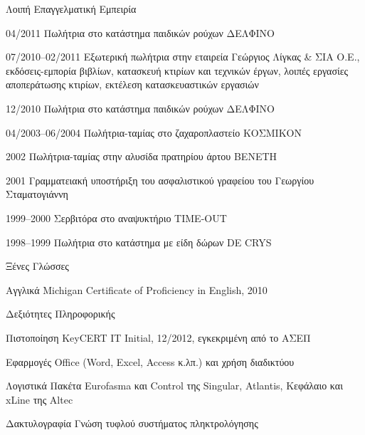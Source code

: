 \documentclass[a4paper]{article}
\begin{document}
\begin{cv}{}
\begin{cvlist}{Λοιπή Επαγγελματική Εμπειρία}
  \item[04/2011] Πωλήτρια στο κατάστημα παιδικών ρούχων
                 \textsf{ΔΕΛΦΙΝΟ}
  \item[07/2010–02/2011] Εξωτερική πωλήτρια στην εταιρεία
                         \textsf{Γεώργιος Λίγκας \& ΣΙΑ
                         Ο.Ε.}, {εκδόσεις}-εμπορία βιβλίων,
                         κατασκευή κτιρίων και τεχνικών
                         έργων, λοιπές εργασίες αποπεράτωσης
                         κτιρίων, εκτέλεση κατασκευαστικών
                         εργασιών
  \item[12/2010] Πωλήτρια στο κατάστημα παιδικών ρούχων
                 \textsf{ΔΕΛΦΙΝΟ}
  \item[04/2003–06/2004] Πωλήτρια-ταμίας στο ζαχαροπλαστείο
                         \textsf{ΚΟΣΜΙΚΟΝ}
  \item[2002] Πωλήτρια-ταμίας στην αλυσίδα πρατηρίου άρτου
              \textsf{ΒΕΝΕΤΗ}
  \item[2001] Γραμματειακή υποστήριξη του ασφαλιστικού
              γραφείου του \textsf{Γεωργίου Σταματογιάννη}
  \item[1999–2000] Σερβιτόρα στο αναψυκτήριο
                   \textsf{TIME-OUT}
  \item[1998–1999] Πωλήτρια στο κατάστημα με είδη δώρων
                   \textsf{DE CRYS}
\end{cvlist}

\begin{cvlist}{Ξένες Γλώσσες}
  \item[Αγγλικά] Michigan Certificate of Proficiency in
                 English, 2010
\end{cvlist}

\begin{cvlist}{Δεξιότητες Πληροφορικής}
  \item[Πιστοποίηση] KeyCERT IT Initial, 12/2012,
                     εγκεκριμένη από το ΑΣΕΠ
  \item[Εφαρμογές] Office (Word, Excel, Access κ.λπ.) και
                   χρήση διαδικτύου
  \item[Λογιστικά] Πακέτα Eurofasma και Control της
                   Singular, Atlantis, Κεφάλαιο και xLine
                   της Altec
  \item[Δακτυλογραφία] Γνώση τυφλού συστήματος
                       πληκτρολόγησης
\end{cvlist}


\end{cv}
\end{document}

